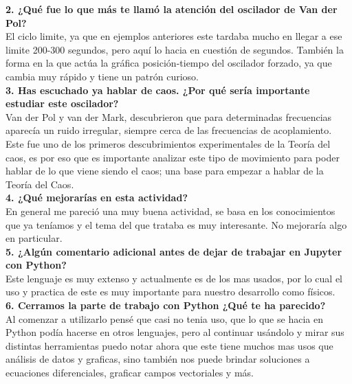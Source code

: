 \documentclass[12pt]{article}
\begin{document}
\noindent\textbf {2. ¿Qué fue lo que más te llamó la atención del oscilador de Van der Pol?} \\

El ciclo limite, ya que en ejemplos anteriores  este tardaba mucho en llegar a ese limite 200-300 segundos, pero aquí lo hacia en cuestión de segundos. También la forma en la que actúa la gráfica posición-tiempo del oscilador forzado, ya que cambia muy rápido y tiene un patrón curioso. \\

\noindent\textbf {3. Has escuchado ya hablar de caos. ¿Por qué sería importante estudiar este oscilador?} \\

Van der Pol y van der Mark, descubrieron que para determinadas frecuencias aparecía un ruido irregular, siempre cerca de las frecuencias de acoplamiento. Este fue uno de los primeros descubrimientos experimentales de la Teoría del caos, es por eso que es importante analizar este tipo de movimiento para poder hablar de lo que viene siendo el caos; una base para empezar a hablar de la Teoría del Caos. \\

\noindent\textbf {4. ¿Qué mejorarías en esta actividad?} \\

En general me pareció una muy buena actividad, se basa en los conocimientos que ya teníamos y el tema del que trataba es muy interesante. No mejoraría algo en particular. \\

\noindent\textbf {5. ¿Algún comentario adicional antes de dejar de trabajar en Jupyter con Python?} \\

Este lenguaje es muy extenso y actualmente es de los mas usados, por lo cual el uso y practica de este es muy importante para nuestro desarrollo como físicos. \\

\noindent\textbf {6. Cerramos la parte de trabajo con Python ¿Qué te ha parecido?} \\

Al comenzar a utilizarlo pensé que casi no tenia uso, que lo que se hacia en Python podía hacerse en otros lenguajes, pero al continuar usándolo y mirar sus distintas herramientas puedo notar ahora que este tiene muchos mas usos que análisis de datos y graficas, sino también nos puede brindar soluciones a ecuaciones diferenciales, graficar campos vectoriales y más.
\end{document}
